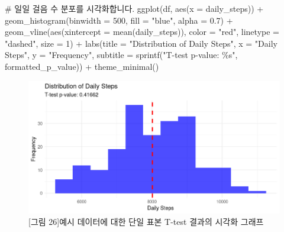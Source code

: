 \documentclass[
  letterpaper,
]{book}
\newenvironment{Shaded}{\begin{snugshade}}{\end{snugshade}}
\newcommand{\AttributeTok}[1]{\textcolor[rgb]{0.40,0.45,0.13}{#1}}
\newcommand{\CommentTok}[1]{\textcolor[rgb]{0.37,0.37,0.37}{#1}}
\newcommand{\DecValTok}[1]{\textcolor[rgb]{0.68,0.00,0.00}{#1}}
\newcommand{\FloatTok}[1]{\textcolor[rgb]{0.68,0.00,0.00}{#1}}
\newcommand{\FunctionTok}[1]{\textcolor[rgb]{0.28,0.35,0.67}{#1}}
\newcommand{\NormalTok}[1]{\textcolor[rgb]{0.00,0.23,0.31}{#1}}
\newcommand{\SpecialCharTok}[1]{\textcolor[rgb]{0.37,0.37,0.37}{#1}}
\newcommand{\StringTok}[1]{\textcolor[rgb]{0.13,0.47,0.30}{#1}}
\renewenvironment{Shaded}
    {\begin{snugshade}
    \begin{singlespace}
    \linespread{1}
    }
    {\end{singlespace}
    \end{snugshade}
}
\begin{document}
\begin{itemize}
\begin{Shaded}
\begin{Highlighting}[]
\CommentTok{\# 일일 걸음 수 분포를 시각화합니다.}
\FunctionTok{ggplot}\NormalTok{(df, }\FunctionTok{aes}\NormalTok{(}\AttributeTok{x =}\NormalTok{ daily\_steps)) }\SpecialCharTok{+}
  \FunctionTok{geom\_histogram}\NormalTok{(}\AttributeTok{binwidth =} \DecValTok{500}\NormalTok{, }\AttributeTok{fill =} \StringTok{"blue"}\NormalTok{, }\AttributeTok{alpha =} \FloatTok{0.7}\NormalTok{) }\SpecialCharTok{+}
  \FunctionTok{geom\_vline}\NormalTok{(}\FunctionTok{aes}\NormalTok{(}\AttributeTok{xintercept =} \FunctionTok{mean}\NormalTok{(daily\_steps)), }\AttributeTok{color =} \StringTok{"red"}\NormalTok{, }\AttributeTok{linetype =} \StringTok{"dashed"}\NormalTok{, }\AttributeTok{size =} \DecValTok{1}\NormalTok{) }\SpecialCharTok{+}
  \FunctionTok{labs}\NormalTok{(}\AttributeTok{title =} \StringTok{"Distribution of Daily Steps"}\NormalTok{,}
   \AttributeTok{x =} \StringTok{"Daily Steps"}\NormalTok{,}
   \AttributeTok{y =} \StringTok{"Frequency"}\NormalTok{,}
   \AttributeTok{subtitle =} \FunctionTok{sprintf}\NormalTok{(}\StringTok{"T{-}test p{-}value: \%s"}\NormalTok{, formatted\_p\_value)) }\SpecialCharTok{+}
  \FunctionTok{theme\_minimal}\NormalTok{()}
\end{Highlighting}
\end{Shaded}
\end{itemize}

\begin{figure}[H]

{\centering \includegraphics{img/fig26.png}

}

\caption{{[}그림 26{]}예시 데이터에 대한 단일 표본 T-test 결과의 시각화
그래프}

\end{figure}%
\end{document}
